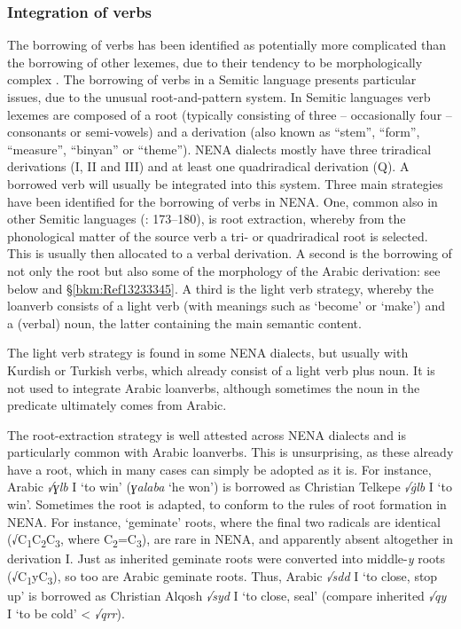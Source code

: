 \documentclass[output=paper]{langsci/langscibook}
\begin{document}
\subsubsection{\label{bkm:Ref13233110}Integration of verbs}

The borrowing of verbs has been identified as potentially more complicated than the borrowing of other lexemes, due to their tendency to be morphologically complex \citep[175]{Matras2009}. The borrowing of verbs in a Semitic language presents particular issues, due to the unusual root-and-pattern system. In Semitic languages verb lexemes are composed of a root (typically consisting of three – occasionally four – consonants or semi-vowels) and a derivation (also known as ``stem'', ``form'', ``measure'', ``binyan'' or ``theme''). NENA dialects mostly have three triradical derivations (I, II and III) and at least one quadriradical derivation (Q). A borrowed verb will usually be integrated into this system. Three main strategies have been identified for the borrowing of verbs in NENA. One, common also in other Semitic languages (\citealt{Wohlgemuth2009}: 173–180), is root extraction, whereby from the phonological matter of the source verb a tri- or quadriradical root is selected. This is usually then allocated to a verbal derivation. A second is the borrowing of not only the root but also some of the morphology of the Arabic derivation: see below and §\ref{bkm:Ref13233345}. A third is the light verb strategy, whereby the loanverb consists of a light verb (with meanings such as `become' or `make') and a (verbal) noun, the latter containing the main semantic content. 

The light verb strategy is found in some NENA dialects, but usually with Kurdish or Turkish verbs, which already consist of a light verb plus noun. It is not used to integrate Arabic loanverbs, although sometimes the noun in the predicate ultimately comes from Arabic.

The root-extraction strategy is well attested across NENA dialects and is particularly common with Arabic loanverbs. This is unsurprising, as these already have a root, which in many cases can simply be adopted as it is. For instance, Arabic \textit{√ɣlb} I ‘to win’ (\textit{ɣalaba} ‘he won’) is borrowed as Christian Telkepe \textit{√\.glb} I ‘to win’. Sometimes the root is adapted, to conform to the rules of root formation in NENA. For instance, ‘geminate’ roots, where the final two radicals are identical (√C\textsubscript{1}C\textsubscript{2}C\textsubscript{3}, where C\textsubscript{2}=C\textsubscript{3}), are rare in NENA, and apparently absent altogether in derivation I. Just as inherited geminate roots were converted into middle-\textit{y} roots (√C\textsubscript{1}yC\textsubscript{3}), so too are Arabic geminate roots. Thus, Arabic \textit{√sdd} I ‘to close, stop up’ is borrowed as Christian Alqosh \textit{√syd} I ‘to close, seal’ (compare inherited \textit{√qy{\R}} I ‘to be cold’ < \textit{√qrr}).
\end{document}
